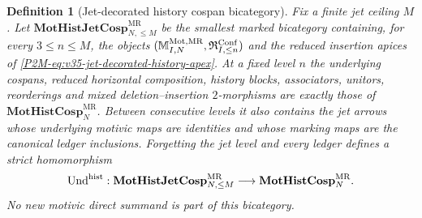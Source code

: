 \documentclass[11pt]{article}
\newtheorem{definition}[theorem]{Definition}
\theoremstyle{remark}
\newcommand{\Mot}{\mathrm{Mot}}
\newcommand{\MR}{\mathrm{MR}}
\begin{document}
\begin{definition}[Jet-decorated history cospan bicategory]
\label{P2M-def:v35-history-jet-bicategory}
Fix a finite jet ceiling $M$.  Let
$\mathbf{MotHistJetCosp}^{\MR}_{N,\le M}$ be the smallest marked bicategory
containing, for every $3\le n\le M$, the objects
$(\mathbb M_{I,N}^{\Mot,\MR},\mathfrak R^{\rm Conf}_{I,\le n})$ and the
reduced insertion apices of
\eqref{P2M-eq:v35-jet-decorated-history-apex}.  At a fixed level $n$ the
underlying cospans, reduced horizontal composition, history blocks,
associators, unitors, reorderings and mixed deletion--insertion $2$-morphisms
are exactly those of $\mathbf{MotHistCosp}^{\MR}_{N}$.  Between consecutive
levels it also contains the jet arrows whose underlying motivic maps are
identities and whose marking maps are the canonical ledger inclusions.
Forgetting the jet level and every ledger defines a strict homomorphism
\[
 \operatorname{Und}^{\rm hist}:
 \mathbf{MotHistJetCosp}^{\MR}_{N,\le M}
 \longrightarrow
 \mathbf{MotHistCosp}^{\MR}_{N}.
\]
No new motivic direct summand is part of this bicategory.
\end{definition}
\end{document}
